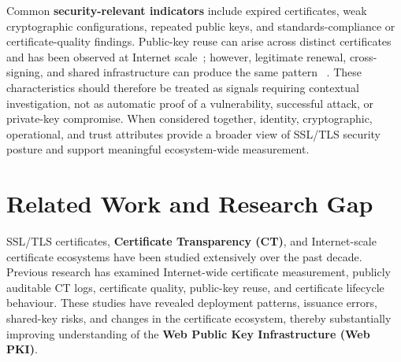 Common \textbf{security-relevant indicators} include expired certificates,
weak cryptographic configurations, repeated public keys, and
standards-compliance or certificate-quality findings. Public-key reuse can
arise across distinct certificates and has been observed at Internet
scale~\cite{nezhadian2025reuse}; however, legitimate renewal, cross-signing,
and shared infrastructure can produce the same pattern
~\cite{junaid2025shared}. These characteristics should therefore be treated as
signals requiring contextual investigation, not as automatic proof of a
vulnerability, successful attack, or private-key compromise. When considered
together, identity, cryptographic, operational, and trust attributes provide a
broader view of SSL/TLS security posture and support meaningful ecosystem-wide
measurement.

\section{Related Work and Research Gap}
\label{sec:related-work-comparison}

SSL/TLS certificates, \textbf{Certificate Transparency (CT)}, and
Internet-scale certificate ecosystems have been studied extensively over the
past decade. Previous research has examined Internet-wide certificate
measurement, publicly auditable CT logs, certificate quality, public-key
reuse, and certificate lifecycle behaviour. These studies have revealed
deployment patterns, issuance errors, shared-key risks, and changes in the
certificate ecosystem, thereby substantially improving understanding of the
\textbf{Web Public Key Infrastructure (Web PKI)}.

